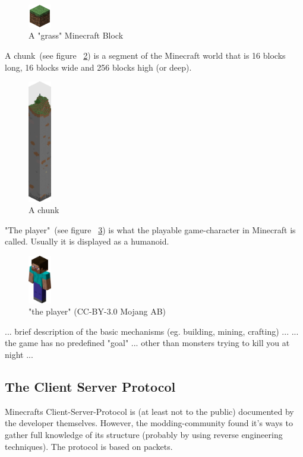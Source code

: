 \begin{figure}[h]
  \centering
    \includegraphics[width=1cm]{graphics/block}
  \caption{A "grass" Minecraft Block}
  \label{mc_block}
\end{figure}
        
A chunk~(see figure ~\ref{mc_chunk}) is a segment of the Minecraft world that is 16 blocks long, 16 blocks wide and 256 blocks high (or deep).~\cite{mcwiki_chunks}

\begin{figure}[h]
  \centering
    \includegraphics[width=1cm]{graphics/chunk}
  \caption{A chunk}
  \label{mc_chunk}
\end{figure}

"The player"~(see figure ~\ref{mc_player}) is what the playable game-character in Minecraft is called. Usually it is displayed as a humanoid.

\begin{figure}[h]
  \centering
    \includegraphics[width=1cm]{graphics/player}
  \caption{"the player" (CC-BY-3.0 Mojang AB) \cite{image_mob}}
  \label{mc_player}
\end{figure}

... brief description of the basic mechanisms (eg. building, mining, crafting) ...
... the game has no predefined "goal" ... other than monsters trying to kill you at night ...

        \subsection{The Client Server Protocol}
Minecrafts Client-Server-Protocol is (at least not to the public) documented by the developer themselves. However, the modding-community found it's ways to gather full knowledge of its structure (probably by using reverse engineering techniques). The protocol is based on packets. 

